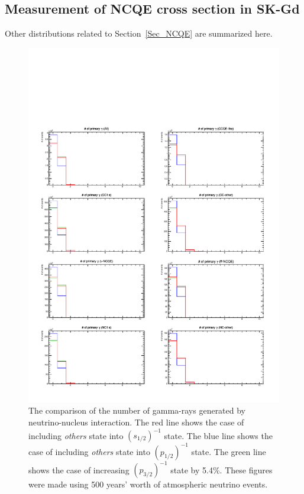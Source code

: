 \clearpage
\subsection{Measurement of NCQE cross section in SK-Gd}\label{App_NCQE}
\vs\hs
Other distributions related to Section~\ref{Sec_NCQE} are summarized here.

\begin{figure}[H]
	\centering
	\includegraphics[width=16cm]{PDF/NEUT/Comparison/gamma/NumPri}
	\caption[The comparison of the number of gamma-rays generated by neutrino-nucleus interaction]{
	The comparison of the number of gamma-rays generated by neutrino-nucleus interaction.
	The red line shows the case of including \textit{others} state into $(s_{1/2})^{-1}$ state.
	The blue line shows the case of including \textit{others} state into $(p_{1/2})^{-1}$ state.
	The green line shows the case of increasing $(p_{3/2})^{-1}$ state by 5.4\%.
	These figures were made using 500 years' worth of atmospheric neutrino events.
	}\label{Comp_gammaNumPri}
\end{figure}

